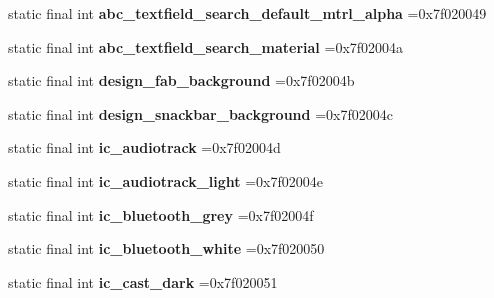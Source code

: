 \begin{DoxyCompactItemize}
static final int {\bfseries abc\+\_\+textfield\+\_\+search\+\_\+default\+\_\+mtrl\+\_\+alpha} =0x7f020049
\item 
\mbox{\label{classproject4_1_1xaria_1_1R_1_1drawable_aa7f313da8757a8e4027f36e49a548a07}} 
static final int {\bfseries abc\+\_\+textfield\+\_\+search\+\_\+material} =0x7f02004a
\item 
\mbox{\label{classproject4_1_1xaria_1_1R_1_1drawable_a2941b81ab1678307ceee25834db02299}} 
static final int {\bfseries design\+\_\+fab\+\_\+background} =0x7f02004b
\item 
\mbox{\label{classproject4_1_1xaria_1_1R_1_1drawable_a382d56275eba3d3f95e25b6a22a767e6}} 
static final int {\bfseries design\+\_\+snackbar\+\_\+background} =0x7f02004c
\item 
\mbox{\label{classproject4_1_1xaria_1_1R_1_1drawable_a136d9749d4c65fb4305f0c94a2afeb81}} 
static final int {\bfseries ic\+\_\+audiotrack} =0x7f02004d
\item 
\mbox{\label{classproject4_1_1xaria_1_1R_1_1drawable_ae5a75142fbf534dcee8f72aa0f0ebd47}} 
static final int {\bfseries ic\+\_\+audiotrack\+\_\+light} =0x7f02004e
\item 
\mbox{\label{classproject4_1_1xaria_1_1R_1_1drawable_ad47b4b1f2a2cc56501414b20bb106a82}} 
static final int {\bfseries ic\+\_\+bluetooth\+\_\+grey} =0x7f02004f
\item 
\mbox{\label{classproject4_1_1xaria_1_1R_1_1drawable_ad8ae19119d4d4634b85057bb6fb4aca7}} 
static final int {\bfseries ic\+\_\+bluetooth\+\_\+white} =0x7f020050
\item 
\mbox{\label{classproject4_1_1xaria_1_1R_1_1drawable_a52fb98a37529ffd7c37166b54ac8971a}} 
static final int {\bfseries ic\+\_\+cast\+\_\+dark} =0x7f020051
\item 
\mbox{\label{classproject4_1_1xaria_1_1R_1_1drawable_a4709d044c3e16a1b9f684d7680bc1c4d}} 

\end{DoxyCompactItemize}
